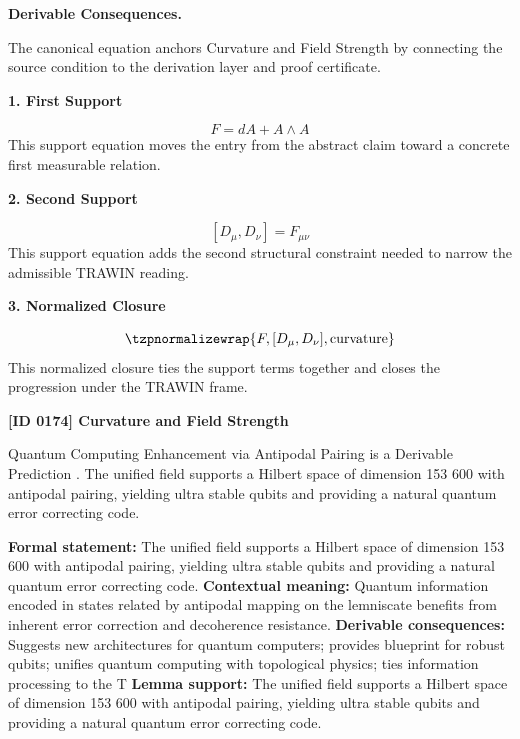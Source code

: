 \par\vspace{0.35em}
\noindent\textbf{Derivable Consequences.}\quad
\begingroup
\footnotesize
\raggedright
The canonical equation anchors Curvature and Field Strength by connecting the source condition to the derivation layer and proof certificate.
\par\endgroup

\noindent\textbf{1. First Support}\par
\[
F = dA + A\wedge A
\]
\noindent This support equation moves the entry from the abstract claim toward a concrete first measurable relation.\par
\noindent\textbf{2. Second Support}\par
\[
[D_\mu, D_\nu] = F_{\mu\nu}
\]
\noindent This support equation adds the second structural constraint needed to narrow the admissible TRAWIN reading.\par
\noindent\textbf{3. Normalized Closure}\par
\[
\tzpnormalizewrap{F,[D_\mu,D_\nu],\text{curvature}}
\]
\noindent This normalized closure ties the support terms together and closes the progression under the TRAWIN frame.\par

\clearpage
\noindent\textbf{[ID 0174] Curvature and Field Strength}\par
\vspace{0.35em}
\begingroup\small
{}
Quantum Computing Enhancement via Antipodal Pairing is a Derivable Prediction  . The unified field supports a Hilbert space of dimension 153 600 with antipodal pairing, yielding ultra stable qubits and providing a natural quantum error correcting code.

\begingroup\footnotesize\setlength{\emergencystretch}{3em}\sloppy
\textbf{Formal statement:} The unified field supports a Hilbert space of dimension 153 600 with antipodal pairing, yielding ultra stable qubits and providing a natural quantum error correcting code.
\textbf{Contextual meaning:} Quantum information encoded in states related by antipodal mapping on the lemniscate benefits from inherent error correction and decoherence resistance.  
\textbf{Derivable consequences:} Suggests new architectures for quantum computers; provides blueprint for robust qubits; unifies quantum computing with topological physics; ties information processing to the T
\textbf{Lemma support:} The unified field supports a Hilbert space of dimension 153 600 with antipodal pairing, yielding ultra stable qubits and providing a natural quantum error correcting code.\par
\endgroup


